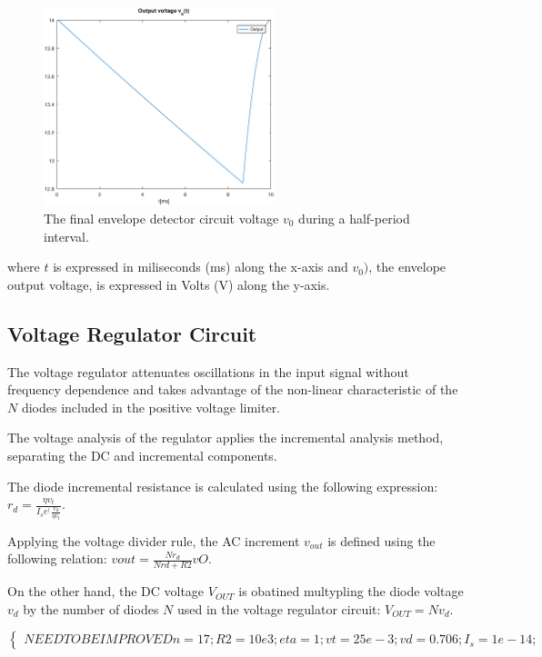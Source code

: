 \begin{figure}[H] \centering
\includegraphics[width=0.6\textwidth]{envelope.eps}
\caption{The final envelope detector circuit voltage $v_0$ during a half-period interval.}
\label{fig:envelope}
\end{figure}

where $t$ is expressed in miliseconds (ms) along the x-axis and 
$v_0)$, the envelope output voltage, is expressed in Volts (V) along the y-axis.

\subsection{Voltage Regulator Circuit}
\label{subsec:regulator}

The voltage regulator attenuates oscillations in the input signal without frequency dependence and takes advantage of the non-linear characteristic of the $N$ diodes included in the positive voltage limiter. 

The voltage analysis of the regulator applies the incremental analysis method, separating the DC and incremental components.

The diode incremental resistance is calculated using the following expression: $r_d=\frac{\eta v_t}{I_s e^(\frac{v_d}{\eta v_t}}$.

Applying the voltage divider rule, the AC increment $v_{out}$ is defined using the following relation: $vout=\frac{N r_d}{N rd+R2}vO$.

On the other hand, the DC voltage $V_{OUT}$ is obatined multypling the diode voltage $v_d$ by the number of diodes $N$ used in the voltage regulator circuit: $V_{OUT}=N v_d$.

\[
\left\{\begin{matrix}
NEED TO BE IMPROVED
n=17;
R2=10e3;
eta=1;
vt=25e-3;
vd=0.706;
I_s=1e-14;
\end{matrix}\right.
\]

